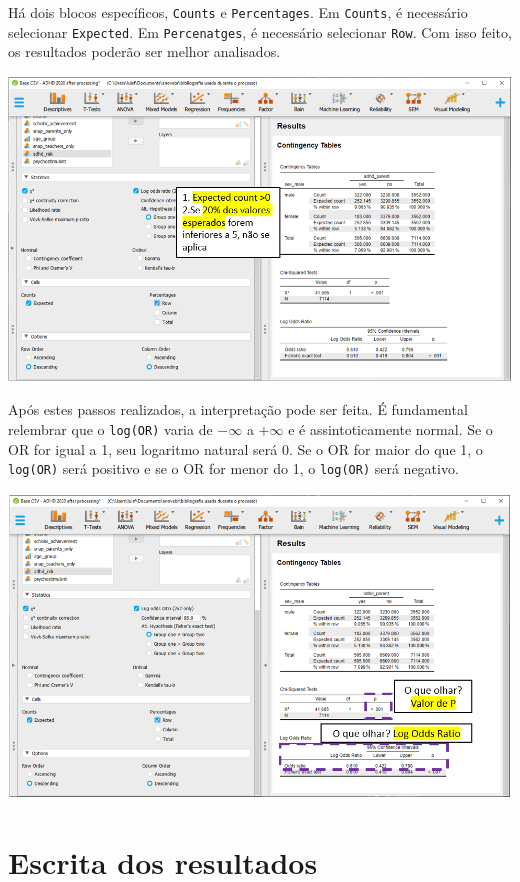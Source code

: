 \documentclass[
]{book}
\begin{document}
Há dois blocos específicos, \texttt{Counts} e \texttt{Percentages}. Em \texttt{Counts}, é necessário selecionar \texttt{Expected}. Em \texttt{Percenatges}, é necessário selecionar \texttt{Row}. Com isso feito, os resultados poderão ser melhor analisados.

\includegraphics{./img/cap_x2_assumptions_2.png}

Após estes passos realizados, a interpretação pode ser feita. É fundamental relembrar que o \texttt{log(OR)} varia de \(-\infty\) a \(+\infty\) e é assintoticamente normal. Se o OR for igual a 1, seu logaritmo natural será 0. Se o OR for maior do que 1, o \texttt{log(OR)} será positivo e se o OR for menor do 1, o \texttt{log(OR)} será negativo.

\includegraphics{./img/cap_x2_log_odds_interpretacao.png}

\hypertarget{escrita-dos-resultados-1}{%
\section{Escrita dos resultados}\label{escrita-dos-resultados-1}}
\end{document}
